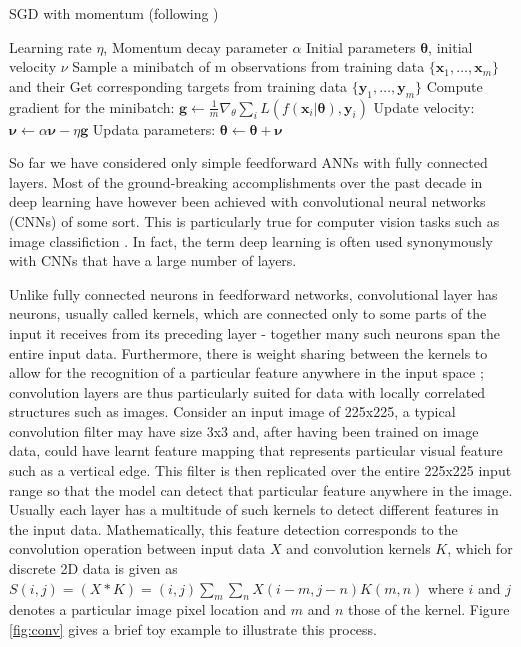 \documentclass{report}
\begin{document}
\begin{algorithm}
  \caption{SGD with momentum (following \cite{Goodfellow2016})} \label{alg:sgd_mom}
\begin{algorithmic}
  \Require Learning rate $\eta$, Momentum decay parameter $\alpha$
  \Require Initial parameters $\pmb{\theta}$, initial velocity $\nu$
  \State Sample a minibatch of m observations from training data $\{\mathbf{x}_1, \dots, \mathbf{x}_m \}$ and their
  \State Get corresponding targets from training data $\{\mathbf{y}_1, \dots, \mathbf{y}_m \}$ 
  \State Compute gradient for the minibatch: $\mathbf{g} \leftarrow \frac{1}{m} \nabla_{\theta}\sum_i L(f(\mathbf{x}_i| \pmb{\theta}), \mathbf{y}_i)$
  \State Update velocity: $\pmb{\nu} \leftarrow \alpha \pmb{\nu} - \eta\mathbf{g}$
  \State Updata parameters: $\pmb{\theta} \leftarrow \pmb{\theta} + \pmb{\nu}$
  \EndWhile
\end{algorithmic}
\end{algorithm}

So far we have considered only simple feedforward ANNs with fully connected layers. Most of the ground-breaking accomplishments over the past decade in deep learning have however been achieved with convolutional neural networks (CNNs) \cite{Le} of some sort. This is particularly true for computer vision tasks such as image classifiction \cite{JurgenSchmidhuber2015}. In fact, the term deep learning is often used synonymously with CNNs that have a large number of layers.

Unlike fully connected neurons in feedforward networks, convolutional layer has neurons, usually called kernels, which are connected only to some parts of the input it receives from its preceding layer - together many such neurons span the entire input data. Furthermore, there is weight sharing between the kernels to allow for the recognition of a particular feature anywhere in the input space \cite{Lecun2015}; convolution layers are thus particularly suited for data with locally correlated structures such as images. Consider an input image of 225x225, a typical convolution filter may have size 3x3 and, after having been trained on image data, could have learnt feature mapping that represents particular visual feature such as a vertical edge. This filter is then replicated over the entire 225x225 input range so that the model can detect that particular feature anywhere in the image. Usually each layer has a multitude of such kernels to detect different features in the input data. Mathematically, this feature detection corresponds to the convolution operation between input data $X$ and convolution kernels $K$, which for discrete 2D data is given as $S(i, j) = (X \ast K)=(i, j) \sum_m \sum_n X(i-m, j-n)K(m, n)$ \cite{Goodfellow2016} where $i$ and $j$ denotes a particular image pixel location and $m$ and $n$ those of the kernel. Figure \ref{fig:conv} gives a brief toy example to illustrate this process. 
  
\end{document}
